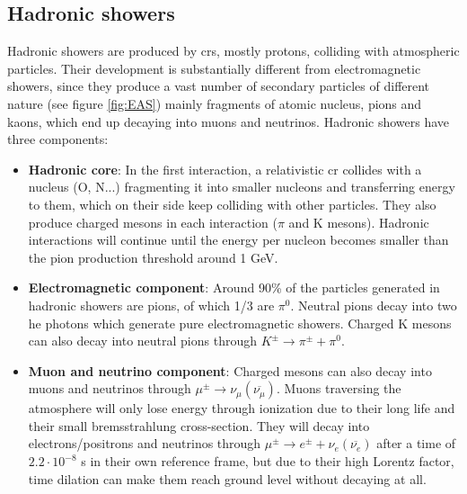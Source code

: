 \documentclass[main.tex]{subfiles}
\begin{document}
\subsection{Hadronic showers}

Hadronic showers are produced by \glspl{cr}, mostly protons, colliding with atmospheric particles. Their development is substantially different from electromagnetic showers, since they produce a vast number of secondary particles of different nature (see figure \ref{fig:EAS}) mainly fragments of atomic nucleus, pions and kaons, which end up decaying into muons and neutrinos. Hadronic showers have three components:\\

\begin{itemize}
    \item \textbf{Hadronic core}: In the first interaction, a relativistic \gls{cr} collides with a nucleus (O, N...) fragmenting it into smaller nucleons and transferring energy to them, which on their side keep colliding with other particles. They also produce charged mesons in each interaction ($\pi$ and K mesons). Hadronic interactions will continue until the energy per nucleon becomes smaller than the pion production threshold around 1 GeV. \\
    
    \item \textbf{Electromagnetic component}: Around 90\% of the particles generated in hadronic showers are pions, of which 1/3 are $\pi^{0}$. Neutral pions decay into two \gls{he} photons which generate pure electromagnetic showers. Charged K mesons can also decay into neutral pions through $K^\pm \longrightarrow \pi^{\pm} + \pi^0$. \\
    
    \item \textbf{Muon and neutrino component}: Charged mesons can also decay into muons and neutrinos through $\mu^{\pm} \longrightarrow \nu_{\mu}(\overline{\nu_{\mu}})$. Muons traversing the atmosphere will only lose energy through ionization due to their long life and their small bremsstrahlung cross-section. They will decay into electrons/positrons and neutrinos through $\mu^{\pm} \longrightarrow e^{\pm} + \nu_{e}(\overline{\nu_{e}})$ after a time of $2.2 \cdot 10^{-8}$ s in their own reference frame, but due to their high Lorentz factor, time dilation can make them reach ground level without decaying at all.\\ 
\end{itemize}
\end{document}
